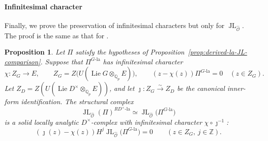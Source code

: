 \documentclass[11pt]{article}
\newtheorem{proposition}[theorem]{Proposition}
\theoremstyle{definition}
\newcommand{\Qp}{\mathbb Q_p}
\newcommand{\la}{\mathrm{la}}
\newcommand{\JL}{\operatorname{JL}}
\newcommand{\Lie}{\operatorname{Lie}}
\begin{document}
\paragraph{Infinitesimal character}Finally, we prove the preservation of infinitesimal characters but only for $\JL_{\widehat{\mathscr{O}}}$. 
The proof is the same as that for \cite[Theorem~7.2.2]{DRC}.
\begin{proposition}%
\label{prop:nonunitary-structural-infinitesimal-character}
Let \(\Pi\) satisfy the hypotheses of
Proposition~\ref{prop:derived-la-JL-comparison}.
Suppose that \(\Pi^{G\text{-}\la}\) has
infinitesimal character
\begin{equation*}
 \chi:Z_G\longrightarrow E,\qquad
 Z_G=Z\bigl(U(\Lie G\otimes_{\Qp}E)\bigr),\qquad
 (z-\chi(z))\Pi^{G\text{-}\la}=0\quad(z\in Z_G).
\end{equation*}
Let \(Z_D=Z(U(\Lie D^\times\otimes_{\Qp}E))\), and let
\(\jmath:Z_G\xrightarrow{\sim}Z_D\) be the canonical
inner-form identification.  The structural complex
\begin{equation*}
 \JL_{\widehat{\mathscr O}}(\Pi)^{RD^\times\text{-}\la}
 \simeq\JL_{\widehat{\mathscr O}}\bigl(\Pi^{G\text{-}\la}\bigr)
\end{equation*}
is a solid locally analytic \(D^\times\)-complex with
infinitesimal character \(\chi\circ\jmath^{-1}\):
\begin{equation*}
 (\jmath(z)-\chi(z))
 H^j\JL_{\widehat{\mathscr O}}\bigl(\Pi^{G\text{-}\la}\bigr)=0
 \qquad(z\in Z_G,\ j\in\mathbb Z).
\end{equation*}
\end{proposition}
\end{document}
